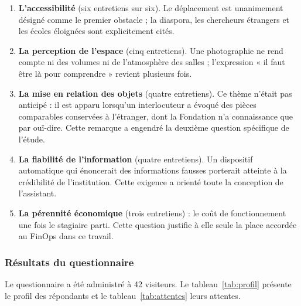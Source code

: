 \begin{enumerate}
  \item \textbf{L'accessibilité} (six entretiens sur six). Le déplacement est
        unanimement désigné comme le premier obstacle ; la diaspora, les
        chercheurs étrangers et les écoles éloignées sont explicitement cités.

  \item \textbf{La perception de l'espace} (cinq entretiens). Une photographie
        ne rend compte ni des volumes ni de l'atmosphère des salles ;
        l'expression « il faut être là pour comprendre » revient plusieurs fois.

  \item \textbf{La mise en relation des objets} (quatre entretiens). Ce thème
        n'était pas anticipé : il est apparu lorsqu'un interlocuteur a évoqué
        des pièces comparables conservées à l'étranger, dont la Fondation n'a
        connaissance que par ouï-dire. Cette remarque a engendré la deuxième
        question spécifique de l'étude.

  \item \textbf{La fiabilité de l'information} (quatre entretiens). Un
        dispositif automatique qui énoncerait des informations fausses
        porterait atteinte à la crédibilité de l'institution. Cette exigence a
        orienté toute la conception de l'assistant.

  \item \textbf{La pérennité économique} (trois entretiens) : le coût de
        fonctionnement une fois le stagiaire parti. Cette question justifie à
        elle seule la place accordée au FinOps dans ce travail.
\end{enumerate}

\subsubsection{Résultats du questionnaire}

Le questionnaire a été administré à 42 visiteurs. Le
tableau~\ref{tab:profil} présente le profil des répondants et le
tableau~\ref{tab:attentes} leurs attentes.

